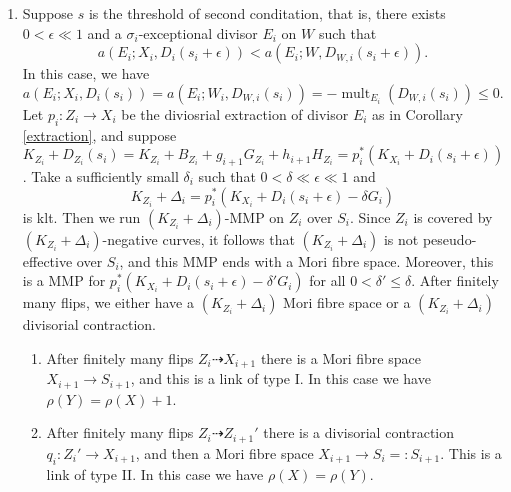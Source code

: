 \documentclass{article}
\begin{document}
\begin{enumerate}
\begin{enumerate}
  \end{enumerate}
  \item\label{2b} Suppose $s$ is the threshold of second conditation, that is, there exists  $0<\epsilon \ll 1$ and a $\sigma_{i}$-exceptional divisor $E_{i}$ on $W$ such that 
    \[
      a(E_{i};X_{i},D_{i}(s_{i}+\epsilon))< a(E_{i};W,D_{W,i}(s_{i}+\epsilon))
    .\]
   In this case, we have 
    \[
  a(E_{i};X_{i},D_{i}(s_{i}))= a(E_{i};W_{i},D_{W,i}(s_{i}))=-\operatorname{mult}_{E_{i}}(D_{W,i}(s_{i}))\leqslant 0
    .\]
    Let $p_{i}:Z_{i}\to X_{i}$ be the diviosrial extraction of divisor $E_{i}$ as in Corollary \ref{extraction}, and suppose $K_{Z_{i}}+D_{Z_{i}}(s_{i})=K_{Z_{i}}+B_{Z_{i}}+g_{i+1}G_{Z_{i}}+h_{i+1}H_{Z_{i}}=p_{i}^*\left(K_{X_{i}}+D_{i}\left(s_{i}+\epsilon\right)\right)$.
   Take a sufficiently small $\delta_{i}$ such that $0<\delta \ll \epsilon \ll 1$ and
   \[
     K_{Z_{i}}+\Delta_{i}=p_{i}^*(K_{X_{i}}+D_{i}(s_{i}+\epsilon)-\delta G_{i})
   \]
  is klt. Then we run $(K_{Z_{i}}+\Delta_{i})$-MMP on $Z_{i}$ over $S_{i}$. Since $Z_{i}$ is covered by $(K_{Z_{i}}+\Delta_{i})$-negative curves, it follows that $(K_{Z_{i}}+\Delta_{i})$ is not peseudo-effective over $S_{i}$, and  this MMP ends with a Mori fibre space. Moreover, this is a MMP for $p_{i}^*(K_{X_{i}}+D_{i}(s_{i}+\epsilon)-\delta'G_{i})$ for all $0<\delta'\leqslant\delta$. After finitely many flips, we either have a $(K_{Z_{i}}+\Delta_{i})$ Mori fibre space or a $(K_{Z_{i}}+\Delta_{i})$ divisorial contraction.
  \begin{enumerate}
    \item\label{2b1} After finitely many flips $Z_{i}\dashrightarrow X_{i+1}$ there is a Mori fibre space $X_{i+1}\to S_{i+1}$, and this is a link of type I. In this case we have $\rho(Y)=\rho(X)+1$.
    \item\label{2b2} After finitely many flips $Z_{i}\dashrightarrow Z_{i+1}'$ there is a divisorial contraction $q_{i}:Z_{i}'\to X_{i+1}$, and then a Mori fibre space $X_{i+1}\to S_{i}=:S_{i+1}$. This is a link of type II. In this case we have $\rho(X)=\rho(Y)$.   
  \end{enumerate}
\end{enumerate}
\end{document}
